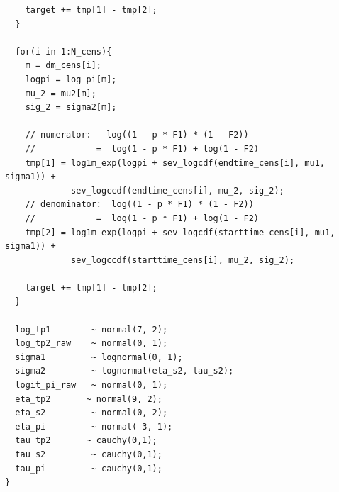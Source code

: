 \documentclass[12pt]{article}
\begin{document}
\begin{appendix}
\begin{verbatim}
    target += tmp[1] - tmp[2];
  }
  
  for(i in 1:N_cens){
    m = dm_cens[i];
    logpi = log_pi[m];
    mu_2 = mu2[m];
    sig_2 = sigma2[m];
  
    // numerator:   log((1 - p * F1) * (1 - F2))
    //            =  log(1 - p * F1) + log(1 - F2)
    tmp[1] = log1m_exp(logpi + sev_logcdf(endtime_cens[i], mu1, sigma1)) + 
             sev_logccdf(endtime_cens[i], mu_2, sig_2);
    // denominator:  log((1 - p * F1) * (1 - F2))
    //            =  log(1 - p * F1) + log(1 - F2)
    tmp[2] = log1m_exp(logpi + sev_logcdf(starttime_cens[i], mu1, sigma1)) + 
             sev_logccdf(starttime_cens[i], mu_2, sig_2);
             
    target += tmp[1] - tmp[2];
  }
  
  log_tp1        ~ normal(7, 2);
  log_tp2_raw    ~ normal(0, 1);
  sigma1         ~ lognormal(0, 1);
  sigma2         ~ lognormal(eta_s2, tau_s2);
  logit_pi_raw   ~ normal(0, 1);
  eta_tp2       ~ normal(9, 2);
  eta_s2         ~ normal(0, 2);
  eta_pi         ~ normal(-3, 1);
  tau_tp2       ~ cauchy(0,1);
  tau_s2         ~ cauchy(0,1);
  tau_pi         ~ cauchy(0,1);
}

\end{verbatim}
\end{appendix}

\pagebreak



\end{document}
